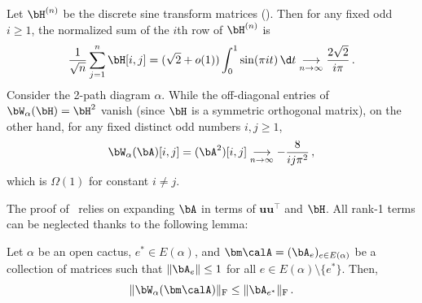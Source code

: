 \begin{example}
        Let $\bH^{(n)}$ be the discrete sine transform matrices ().
        Then for any fixed odd $i\ge 1$, the 
        normalized sum of the $i$th row of
        $\bH^{(n)}$ is
        \[
            \frac {1} {\sqrt n} \sum_{j=1}^n \bH[i,j] = (\sqrt 2+o(1)) \int_0^1 \sin(\pi i t) \,\d t \underset{n\to\infty}{\longrightarrow} \frac {2 \sqrt 2} {i\pi }\,.
        \]
        Consider the 2-path diagram $\alpha$. While the
        off-diagonal entries of $\bW_\alpha(\bH) = \bH^2$
        vanish (since $\bH$ is a symmetric
        orthogonal matrix), on the other hand, for any
        fixed distinct odd numbers $i,j\ge 1$, 
        \[
            \bW_\alpha(\bA)[i,j] = (\bA^2)[i,j]\underset{n\to\infty}{\longrightarrow} -\frac {8} {ij \pi^2}\,,
        \]
        which is $\Omega(1)$ for constant $i\neq j$.
\end{example}

\noindent The proof of~
relies on expanding $\bA$ in terms of
$\bm u\bm u^\top$ and $\bH$. All rank-1 terms
can be neglected thanks to the following
lemma:

\begin{lemma}
    \label{lem:low-rank}
    Let $\alpha$ be an open cactus, $e^*\in E(\alpha)$, and $\bm \calA = (\bA_e)_{e\in E(\alpha)}$
    be a collection of matrices such
    that $\|\bA_e\|\le 1$ for all
    $e\in E(\alpha)\setminus \{e^*\}$. Then,
    \[
        \|\bW_\alpha(\bm \calA)\|_{\textnormal F}\le \|\bA_{e^*}\|_{\textnormal F}\,.
    \]
\end{lemma}


